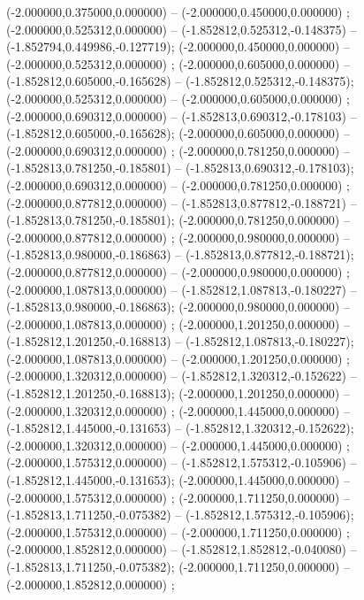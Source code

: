  (-2.000000,0.375000,0.000000) -- (-2.000000,0.450000,0.000000) ;
 (-2.000000,0.525312,0.000000) -- (-1.852812,0.525312,-0.148375) -- (-1.852794,0.449986,-0.127719);
 (-2.000000,0.450000,0.000000) -- (-2.000000,0.525312,0.000000) ;
 (-2.000000,0.605000,0.000000) -- (-1.852812,0.605000,-0.165628) -- (-1.852812,0.525312,-0.148375);
 (-2.000000,0.525312,0.000000) -- (-2.000000,0.605000,0.000000) ;
 (-2.000000,0.690312,0.000000) -- (-1.852813,0.690312,-0.178103) -- (-1.852812,0.605000,-0.165628);
 (-2.000000,0.605000,0.000000) -- (-2.000000,0.690312,0.000000) ;
 (-2.000000,0.781250,0.000000) -- (-1.852813,0.781250,-0.185801) -- (-1.852813,0.690312,-0.178103);
 (-2.000000,0.690312,0.000000) -- (-2.000000,0.781250,0.000000) ;
 (-2.000000,0.877812,0.000000) -- (-1.852813,0.877812,-0.188721) -- (-1.852813,0.781250,-0.185801);
 (-2.000000,0.781250,0.000000) -- (-2.000000,0.877812,0.000000) ;
 (-2.000000,0.980000,0.000000) -- (-1.852813,0.980000,-0.186863) -- (-1.852813,0.877812,-0.188721);
 (-2.000000,0.877812,0.000000) -- (-2.000000,0.980000,0.000000) ;
 (-2.000000,1.087813,0.000000) -- (-1.852812,1.087813,-0.180227) -- (-1.852813,0.980000,-0.186863);
 (-2.000000,0.980000,0.000000) -- (-2.000000,1.087813,0.000000) ;
 (-2.000000,1.201250,0.000000) -- (-1.852812,1.201250,-0.168813) -- (-1.852812,1.087813,-0.180227);
 (-2.000000,1.087813,0.000000) -- (-2.000000,1.201250,0.000000) ;
 (-2.000000,1.320312,0.000000) -- (-1.852812,1.320312,-0.152622) -- (-1.852812,1.201250,-0.168813);
 (-2.000000,1.201250,0.000000) -- (-2.000000,1.320312,0.000000) ;
 (-2.000000,1.445000,0.000000) -- (-1.852812,1.445000,-0.131653) -- (-1.852812,1.320312,-0.152622);
 (-2.000000,1.320312,0.000000) -- (-2.000000,1.445000,0.000000) ;
 (-2.000000,1.575312,0.000000) -- (-1.852812,1.575312,-0.105906) -- (-1.852812,1.445000,-0.131653);
 (-2.000000,1.445000,0.000000) -- (-2.000000,1.575312,0.000000) ;
 (-2.000000,1.711250,0.000000) -- (-1.852813,1.711250,-0.075382) -- (-1.852812,1.575312,-0.105906);
 (-2.000000,1.575312,0.000000) -- (-2.000000,1.711250,0.000000) ;
 (-2.000000,1.852812,0.000000) -- (-1.852812,1.852812,-0.040080) -- (-1.852813,1.711250,-0.075382);
 (-2.000000,1.711250,0.000000) -- (-2.000000,1.852812,0.000000) ;
